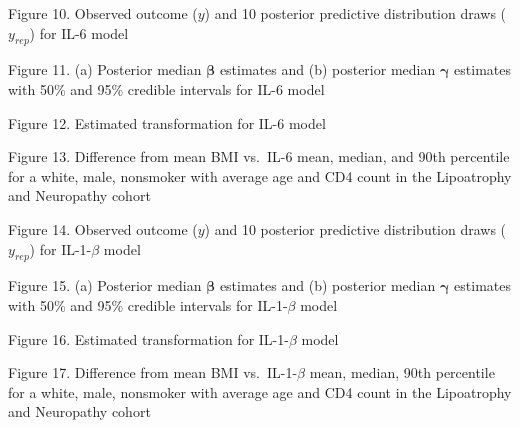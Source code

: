 \documentclass[
]{article}
\begin{document}
Figure 10. Observed outcome (\(y\)) and 10 posterior predictive distribution draws (\(y_{rep}\)) for IL-6 model

Figure 11. (a) Posterior median \(\boldsymbol{\beta}\) estimates and (b) posterior median \(\boldsymbol{\gamma}\) estimates with 50\% and 95\% credible intervals for IL-6 model

Figure 12. Estimated transformation for IL-6 model

Figure 13. Difference from mean BMI vs.~IL-6 mean, median, and 90th percentile for a white, male, nonsmoker with average age and CD4 count in the Lipoatrophy and Neuropathy cohort

Figure 14. Observed outcome (\(y\)) and 10 posterior predictive distribution draws (\(y_{rep}\)) for IL-1-\(\beta\) model

Figure 15. (a) Posterior median \(\boldsymbol{\beta}\) estimates and (b) posterior median \(\boldsymbol{\gamma}\) estimates with 50\% and 95\% credible intervals for IL-1-\(\beta\) model

Figure 16. Estimated transformation for IL-1-\(\beta\) model

Figure 17. Difference from mean BMI vs.~IL-1-\(\beta\) mean, median, 90th percentile for a white, male, nonsmoker with average age and CD4 count in the Lipoatrophy and Neuropathy cohort
\end{document}
